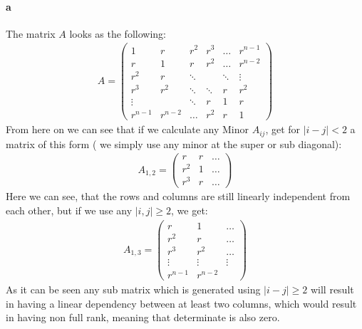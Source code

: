 \paragraph{a}
The matrix $A$ looks as the following:
\begin{gather*}
A = \left( \begin{array}{cccccc}
1 & r & r^2 & r^3 & \ldots & r^{n-1} \\
r & 1 & r & r^2  & \ldots & r^{n-2} \\
r^2 & r & \ddots & & \ddots & \vdots\\
r^3 & r^2 & \ddots & \ddots & r& r^2\\
\vdots &  &  \ddots & r  & 1 & r \\
r^{n-1} & r^{n-2} & \ldots & r^2 & r & 1 
\end{array} \right)
\end{gather*}
From here on we can see that if we calculate any Minor $A_{ij}$, get for $|i-j|< 2$ a matrix of this form ( we simply use any minor at the super or sub diagonal):
\begin{gather*}
A_{1,2} =  \left( \begin{array}{ccc}
r & r & \ldots \\
r^2 & 1 & \ldots \\
r^3 & r & \ldots
\end{array} \right)
\end{gather*}
Here we can see, that the rows and columns are still linearly independent from each other, but if we use any $|i,j| \geq 2$, we get:
\begin{gather*}
A_{1,3} = \left( \begin{array}{ccc}
r & 1 & \ldots \\
r^2 & r & \ldots \\
r^3 & r^2 & \ldots \\
\vdots & \vdots & \vdots\\
r^{n-1} & r^{n-2}
\end{array} \right)
\end{gather*}
As it can be seen any sub matrix which is generated using $|i-j|\geq 2$ will result in having a linear dependency between at least two columns, which would result in having non full rank, meaning that determinate is also zero.
